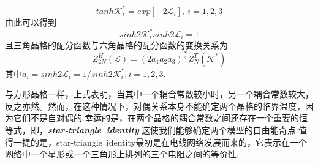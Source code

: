 \documentclass[a4paper]{book}
\newcommand{\xtjc}[1]{\textbf{\textit{#1}}}
\begin{document}
\begin{equation}\label{3.5}
	tanh\mathcal{K}_i^*=exp[-2\mathcal{L}_i],~i=1,2,3
\end{equation}
由此可以得到
\begin{equation}\label{3.6}
	sinh2\mathcal{K}_i^*sinh2\mathcal{L}_i=1
\end{equation}
且三角晶格的配分函数与六角晶格的配分函数的变换关系为
\begin{equation}\label{3.7}
	Z^{H}_{2N}(\mathcal{L})=(2a_1a_2a_3)^{\frac{N}{2}}Z^{T}_N(\mathcal{K}^*)
\end{equation}
其中$a_i=sinh2\mathcal{L}_i=1/sinh2\mathcal{K}^*_i,i=1,2,3$.\par 
与方形晶格一样，上式表明，当其中一个耦合常数较小时，另一个耦合常数较大，反之亦然。然而，在这种情况下，对偶关系本身不能确定两个晶格的临界温度，因为它们不是自对偶的.幸运的是，在两个晶格的耦合常数之间还存在一个重要的恒等式，即，\xtjc{star-triangle~identity}.这使我们能够确定两个模型的自由能奇点.值得一提的是，star-triangle~identity最初是在电线网络发展而来的，它表示在一个网络中一个星形或一个三角形上排列的三个电阻之间的等价性.
\end{document}
